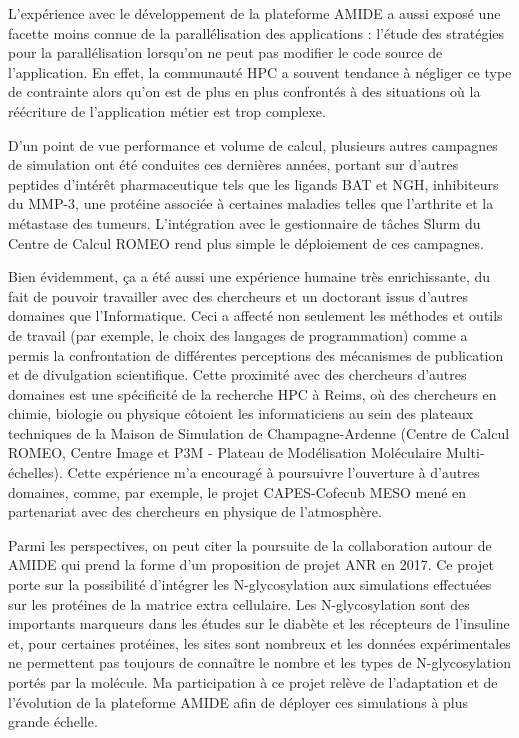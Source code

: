 L'expérience avec le développement de la plateforme AMIDE a aussi exposé une facette moins connue de la parallélisation des applications : l'étude des stratégies pour la parallélisation lorsqu'on ne peut pas modifier le code source de l'application. En effet, la communauté HPC a souvent tendance à négliger ce type de contrainte alors qu'on est de plus en plus confrontés à des situations où la réécriture de l'application métier est trop complexe.  

D'un point de vue performance et volume de calcul, plusieurs autres campagnes de simulation ont été conduites ces dernières années, portant sur d'autres peptides d'intérêt pharmaceutique tels que les ligands BAT et NGH, inhibiteurs du MMP-3, une protéine associée à certaines maladies telles que l'arthrite et la métastase des tumeurs. L'intégration avec le gestionnaire de tâches Slurm du Centre de Calcul ROMEO rend plus simple le déploiement de ces campagnes.

Bien évidemment, ça a été aussi une expérience humaine très enrichissante, du fait de pouvoir travailler avec des chercheurs et un doctorant issus d'autres domaines que l'Informatique. Ceci a affecté non seulement les méthodes et outils de travail (par exemple, le choix des langages de programmation) comme a permis la confrontation de différentes perceptions des mécanismes de publication et de divulgation scientifique. Cette proximité avec des chercheurs d'autres domaines est une spécificité de la recherche HPC à Reims, où des chercheurs en chimie, biologie ou physique côtoient les informaticiens au sein des plateaux techniques de la Maison de Simulation de Champagne-Ardenne (Centre de Calcul ROMEO, Centre Image et P3M - Plateau de Modélisation Moléculaire Multi-échelles). Cette expérience m'a encouragé à poursuivre l'ouverture à d'autres domaines, comme, par exemple, le projet CAPES-Cofecub MESO mené en partenariat avec des chercheurs en physique de l'atmosphère.

Parmi les perspectives, on peut citer la poursuite de la collaboration autour de AMIDE qui prend la forme d'un proposition de projet ANR en 2017. Ce projet porte sur la possibilité d'intégrer les N-glycosylation aux simulations effectuées sur les protéines de la matrice extra cellulaire. Les N-glycosylation sont des importants marqueurs dans les études sur le diabète et les récepteurs de l'insuline et, pour certaines protéines, les sites sont nombreux et les données expérimentales ne permettent pas toujours de connaître le nombre et les types de N-glycosylation portés par la molécule. Ma participation à ce projet relève de l'adaptation et de l'évolution de la plateforme AMIDE afin de déployer ces simulations à plus grande échelle.  


 







